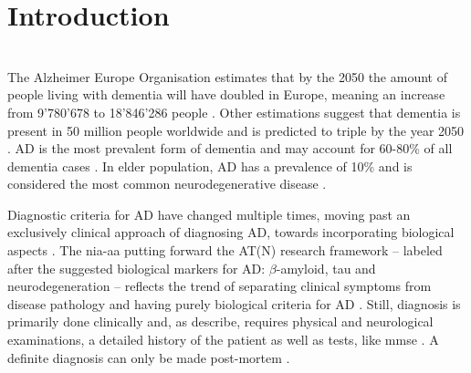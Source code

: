 \section{Introduction} \label{introduction} 


\\


The Alzheimer Europe Organisation estimates that by the 2050 the amount of people living with dementia will have doubled in Europe, meaning an increase from 9'780'678 to 18'846'286 people \autocite{Europe}. Other estimations suggest that dementia is present in 50 million people worldwide and is predicted to triple by the year 2050 \autocite{AZ}. \gls{AD} is the most prevalent form of dementia and may account for 60-80\% of all dementia cases \autocite{8267050}. In elder population, \gls{AD} has a prevalence of 10\% and is considered the most common neurodegenerative disease \autocite{nanniComparisonTransferLearning2020}.


Diagnostic criteria for \gls{AD} have changed multiple times, moving past an exclusively clinical approach of diagnosing \gls{AD}, towards incorporating biological aspects \autocite{SCHELTENS2021}. The \gls{nia-aa} putting forward the AT(N) research framework -- labeled after the suggested biological markers for \gls{AD}: $\beta$-amyloid, tau and neurodegeneration \autocite{jackNIAAAResearchFramework2018} -- reflects the trend of separating clinical symptoms from disease pathology and having purely biological criteria for \gls{AD} \autocite{SCHELTENS2021, ahmedHistoryPerspectiveHow2021}. Still, diagnosis is primarily done clinically \autocite{ahmedHistoryPerspectiveHow2021} and, as \textcite{islamBrainMRIAnalysis2018} describe, requires physical and neurological examinations, a detailed history of the patient as well as tests, like \gls{mmse} \autocite{FOLSTEIN1975189}. A definite diagnosis can only be made post-mortem \autocite{nanniComparisonTransferLearning2020}.

